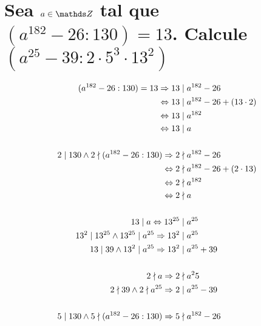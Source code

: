 \documentclass[a4paper,spanish]{article}
\begin{document}
\section{%
  Sea $a \in \Z$ tal que $(a^{182}-26:130) = 13$. %
  Calcule $(a^{25}-39:2 \cdot 5^3 \cdot 13^2)$%
}

\newcommand{\equivfive}{\underset{(5)}\equiv}
\newcommand{\nequivfive}{\underset{(5)}\equiv}

  \begin{align*}
    (a^{182}-26:130) = 13 \then 13   &\mid a^{182}-26                       \\
                            \iif 13   &\mid a^{182} - 26 + (13 \cdot 2)     \\
                            \iif 13   &\mid a^{182}                         \\
                            \iif 13   &\mid a                               \\
    \\
    2 \mid 130 \land 2 \nmid (a^{182}-26:130) %
                          \then 2     &\nmid a^{182}-26                     \\
                            \iif 2    &\nmid a^{182} - 26 + (2 \cdot 13)    \\
                            \iif 2    &\nmid a^{182}                        \\
                            \iif 2    &\nmid a                              \\
    \\
                            13 \mid a \iif 13^{25} &\mid a^{25}             \\
    13^2 \mid 13^{25} \land 13^{25} \mid a^{25} %
                           \then 13^2 &\mid a^{25}                          \\
    13 \mid 39 \land 13^2 \mid a^{25} %
                           \then 13^2 &\mid a^{25} + 39                     \\
    \\
                    2 \nmid a \then 2 &\nmid a^25                           \\
    2 \nmid 39 \land 2 \nmid a^{25} %
                              \then 2 &\mid a^{25} - 39                     \\
    \\
    5 \mid 130 \land 5 \nmid (a^{182}-26:130) %
                              \then 5 &\nmid a^{182} - 26
  \end{align*}
\end{document}
